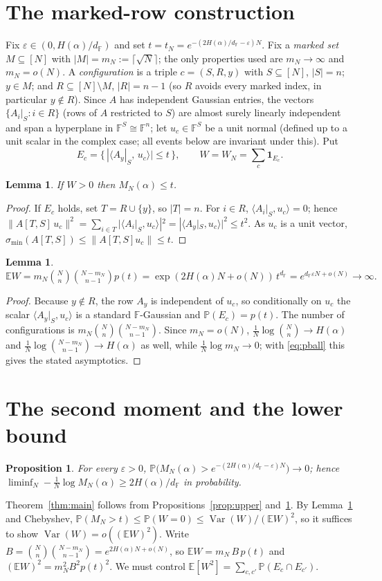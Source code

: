 \documentclass[11pt,reqno]{amsart}
\theoremstyle{plain}
\newtheorem{proposition}[theorem]{Proposition}
\newtheorem{lemma}[theorem]{Lemma}
\theoremstyle{definition}
\theoremstyle{remark}
\newcommand{\F}{\mathbb{F}}
\newcommand{\PP}{\mathbb{P}}
\newcommand{\EE}{\mathbb{E}}
\newcommand{\one}{\mathbf{1}}
\newcommand{\smin}{\sigma_{\min}}
\newcommand{\dF}{d_{\F}}
\DeclareMathOperator{\Var}{Var}
\begin{document}
\section{The marked-row construction}\label{sec:construct}
Fix $\varepsilon\in(0,H(\alpha)/\dF)$ and set $t=t_N=e^{-(2H(\alpha)/\dF-\varepsilon)N}$. Fix a
\emph{marked set} $M\subseteq[N]$ with $|M|=m_N:=\lceil\sqrt N\rceil$; the only properties used are
$m_N\to\infty$ and $m_N=o(N)$. A \emph{configuration} is a triple $c=(S,R,y)$ with $S\subseteq[N]$,
$|S|=n$; $y\in M$; and $R\subseteq[N]\setminus M$, $|R|=n-1$ (so $R$ avoids every marked index, in
particular $y\notin R$). Since $A$ has independent Gaussian entries, the vectors
$\{A_i|_S:i\in R\}$ (rows of $A$ restricted to $S$) are almost surely linearly independent and span a
hyperplane in $\F^S\cong\F^n$; let $u_c\in\F^S$ be a unit normal (defined up to a unit scalar in the
complex case; all events below are invariant under this). Put
\[
  E_c=\bigl\{\,|\langle A_y|_S,\,u_c\rangle|\le t\,\bigr\},\qquad W=W_N=\sum_c \one_{E_c}.
\]
\begin{lemma}\label{lem:suff}
If $W>0$ then $M_N(\alpha)\le t$.
\end{lemma}
\begin{proof}
If $E_c$ holds, set $T=R\cup\{y\}$, so $|T|=n$. For $i\in R$, $\langle A_i|_S,u_c\rangle=0$; hence
$\|A[T,S]\,u_c\|^2=\sum_{i\in T}|\langle A_i|_S,u_c\rangle|^2=|\langle A_y|_S,u_c\rangle|^2\le t^2$.
As $u_c$ is a unit vector, $\smin(A[T,S])\le\|A[T,S]u_c\|\le t$.
\end{proof}
\begin{lemma}\label{lem:mean}
$\EE W=m_N\binom Nn\binom{N-m_N}{n-1}p(t)=\exp(2H(\alpha)N+o(N))\,t^{\dF}=e^{\dF\varepsilon
N+o(N)}\to\infty.$
\end{lemma}
\begin{proof}
Because $y\notin R$, the row $A_y$ is independent of $u_c$, so conditionally on $u_c$ the scalar
$\langle A_y|_S,u_c\rangle$ is a standard $\F$-Gaussian and $\PP(E_c)=p(t)$. The number of
configurations is $m_N\binom Nn\binom{N-m_N}{n-1}$. Since $m_N=o(N)$, $\tfrac1N\log\binom
Nn\to H(\alpha)$ and $\tfrac1N\log\binom{N-m_N}{n-1}\to H(\alpha)$ as well, while $\tfrac1N\log
m_N\to0$; with \eqref{eq:pball} this gives the stated asymptotics.
\end{proof}

\section{The second moment and the lower bound}\label{sec:second}
\begin{proposition}\label{prop:lower}
For every $\varepsilon>0$, $\PP\bigl(M_N(\alpha)>e^{-(2H(\alpha)/\dF-\varepsilon)N}\bigr)\to0$; hence
$\liminf_N-\tfrac1N\log M_N(\alpha)\ge 2H(\alpha)/\dF$ in probability.
\end{proposition}
Theorem~\ref{thm:main} follows from Propositions~\ref{prop:upper} and~\ref{prop:lower}. By
Lemma~\ref{lem:suff} and Chebyshev, $\PP(M_N>t)\le\PP(W=0)\le\Var(W)/(\EE W)^2$, so it suffices to
show $\Var(W)=o((\EE W)^2)$. Write $B=\binom Nn\binom{N-m_N}{n-1}=e^{2H(\alpha)N+o(N)}$, so $\EE
W=m_N\,B\,p(t)$ and $(\EE W)^2=m_N^2B^2p(t)^2$. We must control $\EE[W^2]=\sum_{c,c'}\PP(E_c\cap
E_{c'})$.
\end{document}

